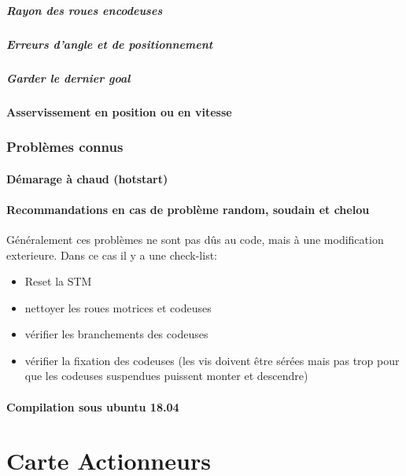 \documentclass{article}
\begin{document}
				\subsubsection{Rayon des roues encodeuses}
				\subsubsection{Erreurs d'angle et de positionnement}
				\subsubsection{Garder le dernier goal}
				\subsection{Asservissement en position ou en vitesse}

		\section{Problèmes connus}
			
			\subsection{Démarage à chaud (hotstart)}
			\subsection{Recommandations en cas de problème random, soudain et chelou}
				Généralement ces problèmes ne sont pas dûs au code, mais à une modification exterieure. Dans ce cas il y a une check-list:
				\begin{itemize}
					\item Reset la STM
					\item nettoyer les roues motrices et codeuses
					\item vérifier les branchements des codeuses
					\item vérifier la fixation des codeuses (les vis doivent être sérées mais pas trop pour que les codeuses suspendues puissent monter et descendre)
				\end{itemize}

			\subsection{Compilation sous ubuntu 18.04}
	\newpage
	\part{Carte Actionneurs}
	\setcounter{section}{0}
\end{document}
